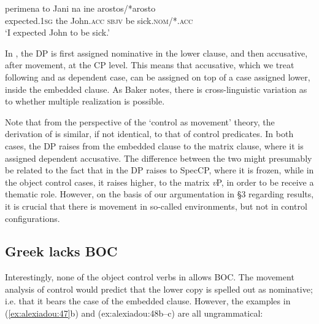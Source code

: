 \documentclass[output=paper]{langsci/langscibook}
\begin{document}
\ea%
    \label{ex:alexiadou:46}
    \gll perimena        to Jani           na    ine arostos/*arosto \\
         expected{}.\textsc{1sg} the John\textsc{{}.acc} \textsc{sbjv} be sick\textsc{{}.nom}/*\textsc{{}.acc} \\
    \glt ‘I expected John to be sick.’ 
    \z


In , the DP is first assigned nominative in the lower clause, and then accusative, after movement, at the CP level. This means that accusative, which we treat following \citet{Marantz1991} and \citet{Baker2015} as dependent case, can be assigned on top of a case assigned lower, inside the embedded clause. As Baker notes, there is cross-linguistic variation as to whether multiple realization is possible. 

Note that from the perspective of the ‘control as movement’ theory, the derivation of  is similar, if not identical, to that of control predicates. In both cases, the DP raises from the embedded clause to the matrix clause, where it is assigned dependent accusative. The difference between the two might presumably be related to the fact that in  the DP raises to SpecCP, where it is frozen, while in the object control cases, it raises higher, to the matrix \textit{v}P, in order to be receive a thematic role. However, on the basis of our argumentation in §3 regarding  results, it is crucial that there is movement in so-called  environments, but not in control configurations. 

\subsection{Greek lacks BOC}%

Interestingly, none of the object control verbs in  allows BOC. The movement analysis of control would predict that the lower copy is spelled out as nominative; i.e. that it bears the case of the embedded clause. However, the examples in (\ref{ex:alexiadou:47}b) and ({ex:alexiadou:48}b--c) are all ungrammatical:



\ea%
    \label{ex:alexiadou:47}
    \z
\z    
\end{document}
